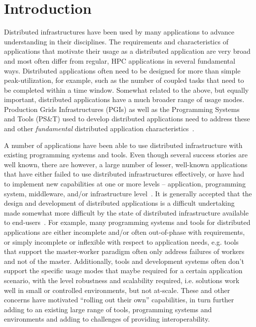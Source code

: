 \documentclass[conference,final]{IEEEtran}
\newcommand{\alnote}[1]{ {\textcolor{blue} { ***AL: #1 }}}
\newcommand{\alnote}[1]{}
\begin{document}
\section{Introduction}
Distributed infrastructures have been used by many applications to
advance understanding in their disciplines.  The requirements and
characteristics of applications that motivate their usage as a
distributed application are very broad and most often differ from
regular, HPC applications in several fundamental ways. Distributed
applications often need to be designed for more than simple
peak-utilization, for example, such as the number of coupled tasks
that need to be completed within a time window.  Somewhat related to
the above, but equally important, distributed applications have a much
broader range of usage modes.  Production Grids Infrastructures (PGIs)
as well as the Programming Systems and Tools (PS\&T) used to develop
distributed applications need to address these and other {\it fundamental}
distributed application characteristics~\cite{dpa-paper}.

A number of applications have been able to use distributed
infrastructure with existing programming systems and tools.
Even though several success stories are well known, there are however,
a large number of lesser, well-known applications that have either
failed to use distributed infrastructures effectively, or have had to
implement new capabilities at one or more levels -- application,
programming system, middleware, and/or infrastructure
level~\cite{dpa-paper,dpagrid2009}.  It is generally accepted that
the design and development of distributed applications is a difficult
undertaking made somewhat more difficult by the state of distributed
infrastructure available to end-users~\cite{dpagrid2009}.  For
example, many programming systems and tools for distributed
applications are either incomplete and/or often out-of-phase with
requirements, or simply incomplete or inflexible with respect to
application needs, e.g. tools that support the master-worker paradigm
often only address failures of workers and not of the master.
Additionally, tools and development systems often don't support the
specific usage modes that maybe required for a certain application
scenario, with the level robustness and scalability required, i.e.
solutions work well in small or controlled environments, but not
at-scale.  These and other concerns have motivated ``rolling out their
own'' capabilities, in turn further adding to an existing large range
of tools, programming systems and environments and adding to
challenges of providing
interoperability.  
\end{document}
